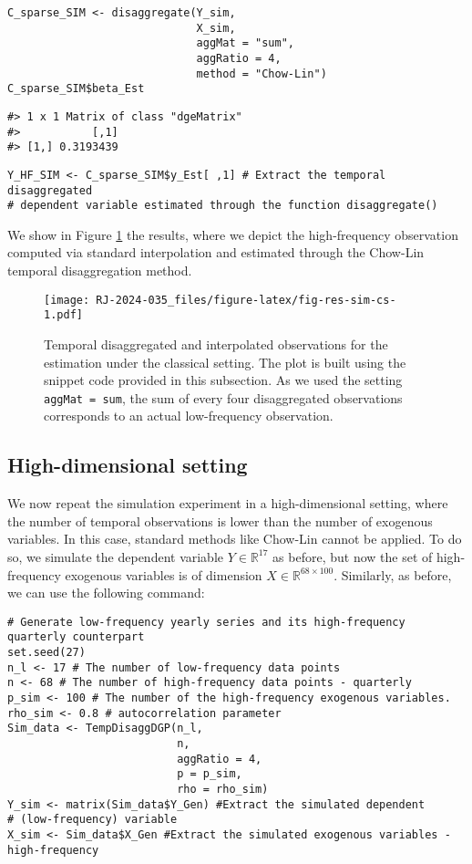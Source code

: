 \begin{verbatim}
C_sparse_SIM <- disaggregate(Y_sim, 
                             X_sim,
                             aggMat = "sum",
                             aggRatio = 4,
                             method = "Chow-Lin")
C_sparse_SIM$beta_Est
\end{verbatim}

\begin{verbatim}
#> 1 x 1 Matrix of class "dgeMatrix"
#>           [,1]
#> [1,] 0.3193439
\end{verbatim}

\begin{verbatim}
Y_HF_SIM <- C_sparse_SIM$y_Est[ ,1] # Extract the temporal disaggregated 
# dependent variable estimated through the function disaggregate()
\end{verbatim}

We show in Figure \ref{fig:fig-res-sim-cs} the results, where we depict the high-frequency observation computed via standard interpolation and estimated through the Chow-Lin temporal disaggregation method.

\begin{figure}
\centering
\texttt{[image: RJ-2024-035\_files/figure-latex/fig-res-sim-cs-1.pdf]}
\caption{\label{fig:fig-res-sim-cs}Temporal disaggregated and interpolated observations for the estimation under the classical setting. The plot is built using the snippet code provided in this subsection. As we used the setting \texttt{aggMat\ =\ sum}, the sum of every four disaggregated observations corresponds to an actual low-frequency observation.}
\end{figure}

\hypertarget{high-dimensional-setting}{%
\subsection{High-dimensional setting}\label{high-dimensional-setting}}

We now repeat the simulation experiment in a high-dimensional setting, where the number of temporal observations is lower than the number of exogenous variables. In this case, standard methods like Chow-Lin cannot be applied.
To do so, we simulate the dependent variable \(Y\in \mathbb{R}^{17}\) as before, but now the set of high-frequency exogenous variables is of dimension \(X \in \mathbb{R}^{68\times 100}\). Similarly, as before, we can use the following command:

\begin{verbatim}
# Generate low-frequency yearly series and its high-frequency quarterly counterpart
set.seed(27)
n_l <- 17 # The number of low-frequency data points 
n <- 68 # The number of high-frequency data points - quarterly
p_sim <- 100 # The number of the high-frequency exogenous variables.
rho_sim <- 0.8 # autocorrelation parameter
Sim_data <- TempDisaggDGP(n_l,
                          n,
                          aggRatio = 4,
                          p = p_sim,
                          rho = rho_sim)
Y_sim <- matrix(Sim_data$Y_Gen) #Extract the simulated dependent 
# (low-frequency) variable
X_sim <- Sim_data$X_Gen #Extract the simulated exogenous variables - high-frequency
\end{verbatim}

